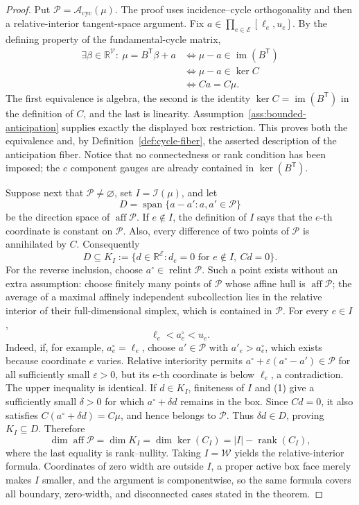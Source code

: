 \documentclass{article}
\begin{document}
\begin{proof}
Put \(\mathcal P=\mathcal A_{\mathrm{cyc}}(\mu)\).  The proof uses incidence--cycle orthogonality and then a relative-interior tangent-space argument.  Fix \(a\in\prod_{e\in\mathcal E}[\ell_e,u_e]\).  By the defining property of the fundamental-cycle matrix,
\[
 \begin{aligned}
 \exists\beta\in\mathbb R^{\mathcal V}:\ \mu=B^{\mathsf T}\beta+a
 &\Longleftrightarrow \mu-a\in\operatorname{im}(B^{\mathsf T})\\
 &\Longleftrightarrow \mu-a\in\ker C\\
 &\Longleftrightarrow Ca=C\mu .
 \end{aligned}
\]
The first equivalence is algebra, the second is the identity \(\ker C=\operatorname{im}(B^{\mathsf T})\) in the definition of \(C\), and the last is linearity.  Assumption~\ref{ass:bounded-anticipation} supplies exactly the displayed box restriction.  This proves both the equivalence and, by Definition~\ref{def:cycle-fiber}, the asserted description of the anticipation fiber.  Notice that no connectedness or rank condition has been imposed; the \(c\) component gauges are already contained in \(\ker(B^{\mathsf T})\).

Suppose next that \(\mathcal P\ne\varnothing\), set \(I=\mathcal I(\mu)\), and let
\[
 D=\operatorname{span}\{a-a':a,a'\in\mathcal P\}
\]
be the direction space of \(\operatorname{aff}\mathcal P\).  If \(e\notin I\), the definition of \(I\) says that the \(e\)-th coordinate is constant on \(\mathcal P\).  Also, every difference of two points of \(\mathcal P\) is annihilated by \(C\).  Consequently
\[
 D\subseteq K_I:=\{d\in\mathbb R^{\mathcal E}:d_e=0\text{ for }e\notin I,\ Cd=0\}.
\]
For the reverse inclusion, choose \(a^\circ\in\operatorname{relint}\mathcal P\).  Such a point exists without an extra assumption: choose finitely many points of \(\mathcal P\) whose affine hull is \(\operatorname{aff}\mathcal P\); the average of a maximal affinely independent subcollection lies in the relative interior of their full-dimensional simplex, which is contained in \(\mathcal P\).  For every \(e\in I\),
\[
 \ell_e<a^\circ_e<u_e. \tag{1}
\]
Indeed, if, for example, \(a^\circ_e=\ell_e\), choose \(a'\in\mathcal P\) with \(a'_e>a^\circ_e\), which exists because coordinate \(e\) varies.  Relative interiority permits \(a^\circ+\varepsilon(a^\circ-a')\in\mathcal P\) for all sufficiently small \(\varepsilon>0\), but its \(e\)-th coordinate is below \(\ell_e\), a contradiction.  The upper inequality is identical.  If \(d\in K_I\), finiteness of \(I\) and (1) give a sufficiently small \(\delta>0\) for which \(a^\circ+\delta d\) remains in the box.  Since \(Cd=0\), it also satisfies \(C(a^\circ+\delta d)=C\mu\), and hence belongs to \(\mathcal P\).  Thus \(\delta d\in D\), proving \(K_I\subseteq D\).  Therefore
\[
 \dim\operatorname{aff}\mathcal P
 =\dim K_I
 =\dim\ker(C_I)
 =|I|-\operatorname{rank}(C_I),
\]
where the last equality is rank--nullity.  Taking \(I=\mathcal W\) yields the relative-interior formula.  Coordinates of zero width are outside \(I\), a proper active box face merely makes \(I\) smaller, and the argument is componentwise, so the same formula covers all boundary, zero-width, and disconnected cases stated in the theorem.
\end{proof}
\end{document}
